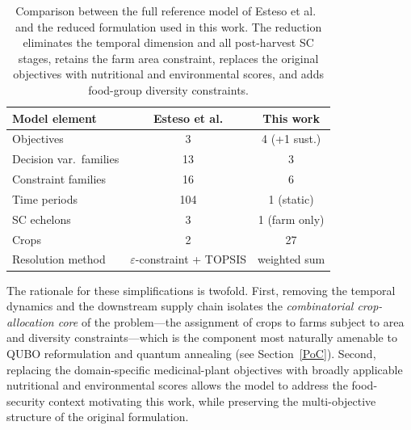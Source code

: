 \begin{table}[ht]
\centering
\small
\begin{tabular}{lcc}
\toprule
\textbf{Model element} & \textbf{Esteso et al.} & \textbf{This work} \\
\midrule
Objectives             & 3  & 4 (+1 sust.) \\
Decision var.\ families & 13 & 3 \\
Constraint families    & 16 & 6 \\
Time periods           & 104 & 1 (static) \\
SC echelons            & 3  & 1 (farm only) \\
Crops                  & 2  & 27 \\
Resolution method      & $\varepsilon$-constraint + TOPSIS & weighted sum \\
\bottomrule
\end{tabular}
\caption{Comparison between the full reference model of Esteso et al.~\cite{esteso_sustainable_2023} and the reduced formulation used in this work. The reduction eliminates the temporal dimension and all post-harvest SC stages, retains the farm area constraint, replaces the original objectives with nutritional and environmental scores, and adds food-group diversity constraints.}
\label{tab:model_reduction}
\end{table}

The rationale for these simplifications is twofold. First, removing the temporal dynamics and the downstream supply chain isolates the \emph{combinatorial crop-allocation core} of the problem---the assignment of crops to farms subject to area and diversity constraints---which is the component most naturally amenable to QUBO reformulation and quantum annealing (see Section~\ref{PoC}). Second, replacing the domain-specific medicinal-plant objectives with broadly applicable nutritional and environmental scores allows the model to address the food-security context motivating this work, while preserving the multi-objective structure of the original formulation.
